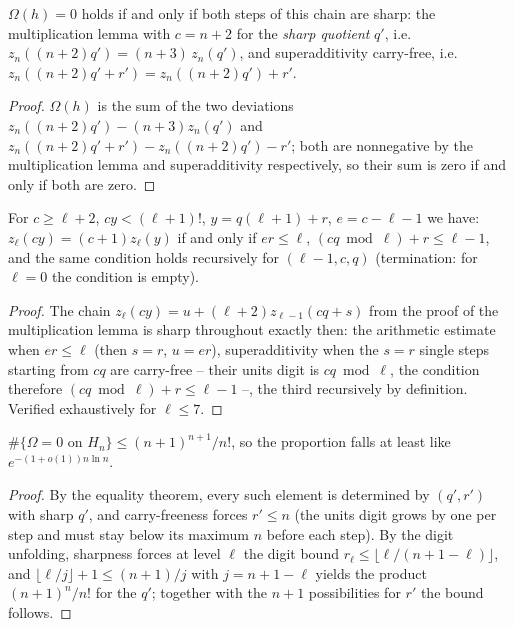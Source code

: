 \begin{satz}
$\Omega(h)=0$ holds if and only if both steps of this chain are
sharp: the multiplication lemma with $c=n{+}2$ for the
\emph{sharp quotient} $q'$, i.e.\
$z_n((n{+}2)q')=(n{+}3)\,z_n(q')$, and superadditivity
carry-free, i.e.\ $z_n((n{+}2)q'+r')=z_n((n{+}2)q')+r'$.
\end{satz}

\begin{proof}
$\Omega(h)$ is the sum of the two deviations
$z_n((n{+}2)q')-(n{+}3)z_n(q')$ and
$z_n((n{+}2)q'+r')-z_n((n{+}2)q')-r'$; both are nonnegative by
the multiplication lemma and superadditivity respectively, so
their sum is zero if and only if both are zero.
\end{proof}

\begin{satz}
For $c\ge\ell+2$, $cy<(\ell+1)!$, $y=q(\ell+1)+r$, $e=c-\ell-1$
we have: $z_\ell(cy)=(c{+}1)z_\ell(y)$ if and only if $er\le\ell$,
$(cq\bmod\ell)+r\le\ell-1$, and the same condition holds
recursively for
$(\ell{-}1,c,q)$ (termination: for $\ell=0$ the condition is
empty).
\end{satz}

\begin{proof}
The chain $z_\ell(cy)=u+(\ell+2)z_{\ell-1}(cq+s)$ from the proof
of the multiplication lemma is sharp throughout exactly then: the
arithmetic estimate when $er\le\ell$ (then $s=r$, $u=er$),
superadditivity when the $s=r$ single steps starting from $cq$
are carry-free -- their units digit is $cq\bmod\ell$, the
condition therefore $(cq\bmod\ell)+r\le\ell-1$ --, the third
recursively by definition. Verified exhaustively for $\ell\le7$.
\end{proof}

\begin{satz}
$\#\{\Omega=0\text{ on }H_n\}\le(n{+}1)^{n+1}/n!$, so the
proportion falls at least like $e^{-(1+o(1))n\ln n}$.
\end{satz}

\begin{proof}
By the equality theorem, every such element is determined by
$(q',r')$ with sharp $q'$, and carry-freeness forces
$r'\le n$ (the units digit grows by one per step and must stay
below its maximum $n$ before each step). By the digit unfolding,
sharpness forces at level $\ell$ the
digit bound $r_\ell\le\lfloor\ell/(n{+}1{-}\ell)\rfloor$, and
$\lfloor\ell/j\rfloor+1\le(n{+}1)/j$ with $j=n{+}1{-}\ell$ yields
the product $(n{+}1)^n/n!$ for the $q'$; together with the
$n{+}1$ possibilities for $r'$ the bound follows.
\end{proof}

